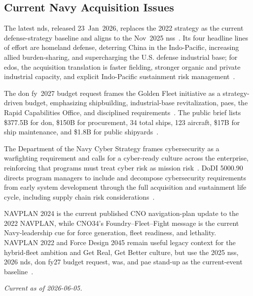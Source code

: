 \documentclass[../main.tex]{subfiles}
\begin{document}
\subsection{Current Navy Acquisition Issues}
\begin{description}[style=nextline,labelsep=0.5em,font=\bfseries]
  \item[\textbf{2026 NDS release.}] The latest \ac{nds}, released 23~Jan~2026, replaces the 2022 strategy as the current defense-strategy baseline and aligns to the Nov~2025 \ac{nss}~\autocite{NDS-2026,NSS-2025}. Its four headline lines of effort are homeland defense, deterring China in the Indo-Pacific, increasing allied burden-sharing, and supercharging the U.S. defense industrial base; for \acp{edo}, the acquisition translation is faster fielding, stronger organic and private industrial capacity, and explicit Indo-Pacific sustainment risk management~\autocite{NDS-2026}.
  \item[\textbf{Golden Fleet and FY27 budget signal.}] The \ac{don} \ac{fy}~2027 budget request frames the Golden Fleet initiative as a strategy-driven budget, emphasizing shipbuilding, industrial-base revitalization, \acp{pae}, the Rapid Capabilities Office, and disciplined requirements~\autocite{DON-FY27-Budget-Request-2026}. The public brief lists \$377.5B for \ac{don}, \$150B for procurement, 34 total ships, 123 aircraft, \$17B for ship maintenance, and \$1.8B for public shipyards~\autocite{DON-FY27-Budget-Request-2026}.
  \item[\textbf{Make cybersecurity part of our DNA.}] The Department of the Navy Cyber Strategy frames cybersecurity as a warfighting requirement and calls for a cyber-ready culture across the enterprise, reinforcing that programs must treat cyber risk as mission risk~\autocite{DON-CyberStrategy-2023}. DoDI 5000.90 directs program managers to include and decompose cybersecurity requirements from early system development through the full acquisition and sustainment life cycle, including supply chain risk considerations~\autocite{DoDI5000-90}.
  \item[\textbf{Navy strategy cues.}] NAVPLAN 2024 is the current published CNO navigation-plan update to the 2022 NAVPLAN, while CNO34's Foundry--Fleet--Fight message is the current Navy-leadership cue for force generation, fleet readiness, and lethality. NAVPLAN 2022 and Force Design 2045 remain useful legacy context for the hybrid-fleet ambition and Get Real, Get Better culture, but use the 2025 \ac{nss}, 2026 \ac{nds}, \ac{don} \ac{fy}27 budget request, \ac{was}, and \ac{pae} stand-up as the current-event baseline~\autocite{NAVPLAN2024,cno34-day-one-message-2025,NAVPLAN2022,NSS-2025,NDS-2026,DON-FY27-Budget-Request-2026,DON-PAE-Establishment-2026}.
\end{description}
\noindent\textit{Current as of 2026-06-05.}
\end{document}
